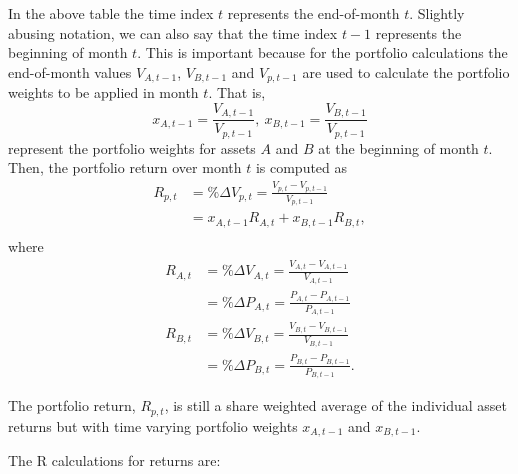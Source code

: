 \documentclass[
  letterpaper,
  DIV=11,
  numbers=noendperiod]{scrreprt}
\theoremstyle{definition}
\theoremstyle{definition}
\theoremstyle{remark}
\begin{document}
In the above table the time index \(t\) represents the end-of-month
\(t\). Slightly abusing notation, we can also say that the time index
\(t-1\) represents the beginning of month \(t\). This is important
because for the portfolio calculations the end-of-month values
\(V_{A,t-1}\), \(V_{B,t-1}\) and \(V_{p,t-1}\) are used to calculate the
portfolio weights to be applied in month \(t\). That is,
\[x_{A,t-1} = \frac{V_{A,t-1}}{V_{p,t-1}}, ~ x_{B,t-1} = \frac{V_{B,t-1}}{V_{p,t-1}}\]
represent the portfolio weights for assets \(A\) and \(B\) at the
beginning of month \(t\). Then, the portfolio return over month \(t\) is
computed as \begin{align}
R_{p,t} &= \%\Delta V_{p,t} = \frac{V_{p,t} - V_{p,t-1}}{V_{p,t-1}}\\
&= x_{A,t-1}R_{A,t} + x_{B,t-1}R_{B,t},\\
\end{align} where \begin{align}
R_{A,t} &= \%\Delta V_{A,t} = \frac{V_{A,t} - V_{A,t-1}}{V_{A,t-1}}\\
&= \%\Delta P_{A,t} = \frac{P_{A,t} - P_{A,t-1}}{P_{A,t-1}}\\
R_{B,t} &= \%\Delta V_{B,t} = \frac{V_{B,t} - V_{B,t-1}}{V_{B,t-1}}\\
&= \%\Delta P_{B,t} = \frac{P_{B,t} - P_{B,t-1}}{P_{B,t-1}}.
\end{align}

The portfolio return, \(R_{p,t}\), is still a share weighted average of
the individual asset returns but with time varying portfolio weights
\(x_{A,t-1}\) and \(x_{B,t-1}\).

The R calculations for returns are:
\end{document}
